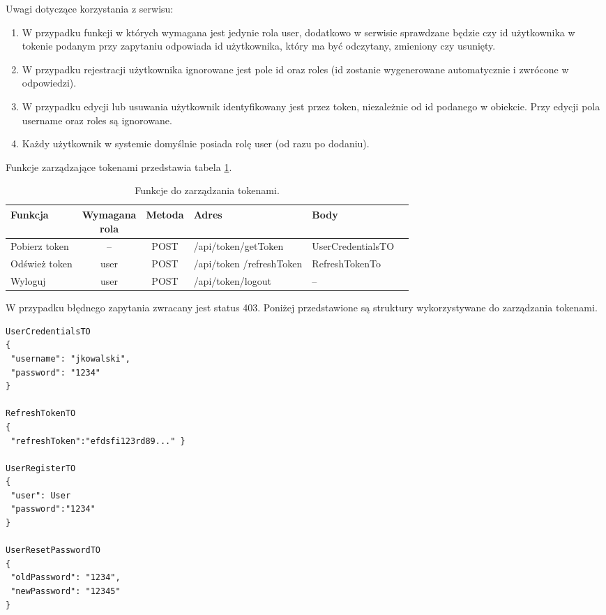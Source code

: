 \documentclass[11pt,a4paper,twoside]{article}
\begin{document}
Uwagi dotyczące korzystania z serwisu:
\begin{enumerate}
\setlength\itemsep{1.5em}
\item W przypadku funkcji w których wymagana jest jedynie rola user, dodatkowo w serwisie sprawdzane będzie czy id użytkownika w tokenie podanym przy zapytaniu odpowiada id użytkownika, który ma być odczytany, zmieniony czy usunięty.
\item W przypadku rejestracji użytkownika ignorowane jest pole id oraz roles (id zostanie wygenerowane automatycznie i zwrócone w odpowiedzi).
\item W przypadku edycji lub usuwania użytkownik identyfikowany jest przez token, niezależnie od id podanego w obiekcie. Przy edycji pola username oraz roles są ignorowane.
\item Każdy użytkownik w systemie domyślnie posiada rolę user (od razu po dodaniu).
\end{enumerate}

Funkcje zarządzające tokenami przedstawia tabela \ref{obslugaTokenow}.

\begin{table}[H]
\caption{Funkcje do zarządzania tokenami.}
\label{obslugaTokenow}
\centering
\begin{tabularx}{\textwidth}{|X|c|c|X|X|X|}
\hline
 Funkcja & \makecell{Wymagana \\ rola} & Metoda & Adres & Body \\\hline
 Pobierz token & -- & POST & /api/token/getToken & UserCredentialsTO \\\hline
 Odśwież token & user & POST & /api/token /refreshToken & RefreshTokenTo \\\hline
 Wyloguj & user & POST & /api/token/logout & -- \\\hline
\end{tabularx}
\end{table}

W przypadku błędnego zapytania zwracany jest status 403.
Poniżej przedstawione są struktury wykorzystywane do zarządzania tokenami.

\begin{lstlisting}
UserCredentialsTO
{
 "username": "jkowalski",
 "password": "1234"
}

RefreshTokenTO 
{ 
 "refreshToken":"efdsfi123rd89..." }

UserRegisterTO
{
 "user": User
 "password":"1234"
}

UserResetPasswordTO
{
 "oldPassword": "1234",
 "newPassword": "12345"
}
\end{lstlisting}
\vspace{-20pt}
\end{document}
